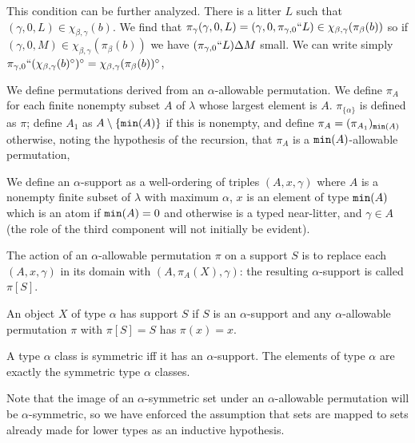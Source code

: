 \documentclass[12pt]{article}
\begin{document}
	This condition can be further analyzed.  There is a litter $L$ such that $(\gamma,0,L) \in \chi_{\beta,\gamma}(b)$.    We find that $\pi_\gamma(\gamma,0,L) = (\gamma,0,\pi_{\gamma,0}``L) \in \chi_{\beta,\gamma}(\pi_\beta(b))$ so  if $(\gamma,0,M) \in  \chi_{\beta,\gamma}(\pi_\beta(b))$ we have
$(\pi_{\gamma,0}``L )\Delta M$ small.  We can write simply $\pi_{\gamma,0}``(\chi_{\beta,\gamma}(b)^\circ) ^{\circ}= \chi_{\beta,\gamma}(\pi_\beta(b))^\circ$,

We define permutations derived from an $\alpha$-allowable permutation.  We define $\pi_A$ for each finite nonempty subset $A$ of $\lambda$ whose largest element is $A$.  $\pi_{\{\alpha\}}$ is defined as $\pi$;  define $A_1$ as $A \setminus \{{\tt min}(A)\}$ if this is nonempty, and define $\pi_A = (\pi_{A_1})_{{\tt min}(A)}$ otherwise, noting the hypothesis of the recursion, that $\pi_A$ is a ${\tt min}(A)$-allowable permutation,

We define an $\alpha$-support as a well-ordering of triples $(A,x,\gamma)$ where $A$ is a nonempty finite subset of $\lambda$ with maximum $\alpha$, $x$ is an element of type ${\tt min}(A)$ which is an atom if ${\tt min}(A)=0$ and otherwise is a typed near-litter, and $\gamma \in A$ (the role of the third component will not initially be evident).

The action of an $\alpha$-allowable permutation $\pi$ on a support $S$ is to replace each $(A,x,\gamma)$ in its domain with $(A,\pi_A(X),\gamma)$:  the resulting $\alpha$-support is called $\pi[S]$.

An object $X$ of type $\alpha$ has support $S$ if $S$ is an $\alpha$-support and any $\alpha$-allowable permutation $\pi$ with $\pi[S]=S$ has $\pi(x)=x$.

A type $\alpha$ class is symmetric iff it has an $\alpha$-support.  The elements of type $\alpha$ are exactly the symmetric type $\alpha$ classes.

Note that the image of an $\alpha$-symmetric set under an $\alpha$-allowable permutation will be $\alpha$-symmetric, so we have enforced the assumption that sets are mapped to sets already made for lower types as an inductive hypothesis.
\end{document}
